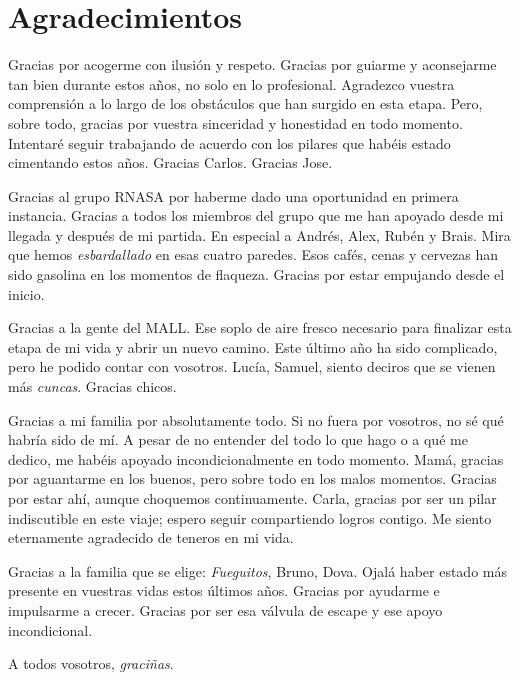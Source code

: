%
%

\chapter*{Agradecimientos}
\label{front:acknowledgments}


{\textsc
Gracias por acogerme con ilusión y respeto. Gracias por guiarme y aconsejarme tan bien durante estos años, no solo en lo profesional. Agradezco vuestra comprensión a lo largo de los obstáculos que han surgido en esta etapa. Pero, sobre todo, gracias por vuestra sinceridad y honestidad en todo momento. Intentaré seguir trabajando de acuerdo con los pilares que habéis estado cimentando estos años. Gracias Carlos. Gracias Jose.

\vspace{-8pt}

Gracias al grupo RNASA por haberme dado una oportunidad en primera instancia. Gracias a todos los miembros del grupo que me han apoyado desde mi llegada y después de mi partida. En especial a Andrés, Alex, Rubén y Brais. Mira que hemos \textit{esbardallado} en esas cuatro paredes. Esos cafés, cenas y cervezas han sido gasolina en los momentos de flaqueza. Gracias por estar empujando desde el inicio.

\vspace{-8pt}

Gracias a la gente del MALL. Ese soplo de aire fresco necesario para finalizar esta etapa de mi vida y abrir un nuevo camino. Este último año ha sido complicado, pero he podido contar con vosotros. Lucía, Samuel, siento deciros que se vienen más \textit{cuncas}. Gracias chicos.

\vspace{-8pt}

Gracias a mi familia por absolutamente todo. Si no fuera por vosotros, no sé qué habría sido de mí. A pesar de no entender del todo lo que hago o a qué me dedico, me habéis apoyado incondicionalmente en todo momento. Mamá, gracias por aguantarme en los buenos, pero sobre todo en los malos momentos. Gracias por estar ahí, aunque choquemos continuamente. Carla, gracias por ser un pilar indiscutible en este viaje; espero seguir compartiendo logros contigo. Me siento eternamente agradecido de teneros en mi vida.

\vspace{-8pt}

Gracias a la familia que se elige: \textit{Fueguitos}, Bruno, Dova. Ojalá haber estado más presente en vuestras vidas estos últimos años. Gracias por ayudarme e impulsarme a crecer. Gracias por ser esa válvula de escape y ese apoyo incondicional.

\vspace{-8pt}

A todos vosotros, \textit{graciñas}.

\vspace{-8pt}


}